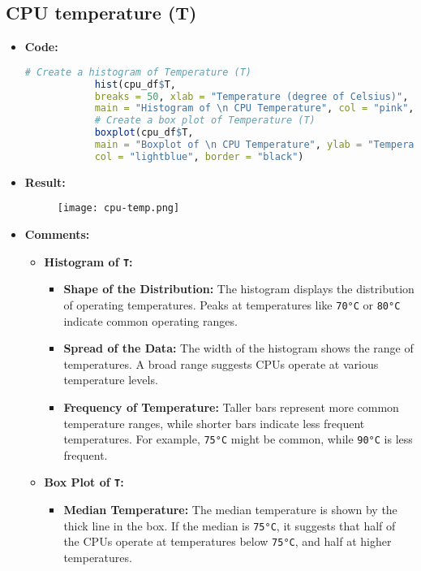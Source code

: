 \documentclass{article}
\begin{document}
	\subsection{CPU temperature (T)}
	\begin{itemize}
		\item \textbf{Code:}
		\begin{lstlisting}[basicstyle=\ttfamily, frame=single,language=R]
			# Create a histogram of Temperature (T)
			hist(cpu_df$T, 
			breaks = 50, xlab = "Temperature (degree of Celsius)", ylab = "Frequency", 
			main = "Histogram of \n CPU Temperature", col = "pink", border = "black")
			# Create a box plot of Temperature (T)
			boxplot(cpu_df$T, 
			main = "Boxplot of \n CPU Temperature", ylab = "Temperature (degree of Celsius)", 
			col = "lightblue", border = "black")
		\end{lstlisting}
		\item \textbf{Result:}
		\begin{figure}[h]
			\centering
			\texttt{[image: cpu-temp.png]}   %
			\label{fig:enter-label}
		\end{figure}
		\item \textbf{Comments:}
		\begin{itemize}
			\item \textbf{Histogram of \texttt{T}:}
			\begin{itemize}
				\item \textbf{Shape of the Distribution:} The histogram displays the distribution of operating temperatures. Peaks at temperatures like \texttt{70°C} or \texttt{80°C} indicate common operating ranges.
				\item \textbf{Spread of the Data:} The width of the histogram shows the range of temperatures. A broad range suggests CPUs operate at various temperature levels.
				\item \textbf{Frequency of Temperature:} Taller bars represent more common temperature ranges, while shorter bars indicate less frequent temperatures. For example, \texttt{75°C} might be common, while \texttt{90°C} is less frequent.
			\end{itemize}
			\item \textbf{Box Plot of \texttt{T}:}
			\begin{itemize}
				\item \textbf{Median Temperature:} The median temperature is shown by the thick line in the box. If the median is \texttt{75°C}, it suggests that half of the CPUs operate at temperatures below \texttt{75°C}, and half at higher temperatures.

\end{itemize}
\end{itemize}
\end{itemize}
\end{document}
